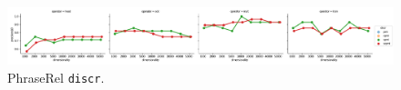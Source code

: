 \begin{figure}[b]
  \centering

  \includegraphics[width=1.1\textwidth]{supplement/figures/phraserel-interaction-discr}

  \caption{PhraseRel \texttt{discr}.}
  \label{fig:phraserel-discr}
\end{figure}
